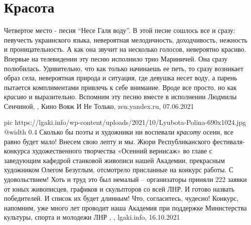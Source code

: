  
 
 
 
 
\chapter{Красота}
\label{sec:slova.krasota}

Четвертое место - песня \enquote{Несе Галя воду}. В этой песне сошлось все и
сразу: певучесть украинского языка, невероятная мелодичность, доходчивость,
нежность и проницательность. А как она звучит на несколько голосов, невероятно
красиво. Впервые на телевидении эту песню исполнило трио Мариничей. Она сразу
полюбилась. Удивительно, что как только начинаешь ее петь, то сразу возникает
образ села, невероятная природа и ситуация, где девушка несет воду, а парень
пытается комплиментами привлечь к себе внимание. Вроде все просто, но как
\emph{красиво} и выразительно. Вспомним эту песню вместе в исполнении Людмилы
Сенчиной,
, 
Кино Вояж И Не Только, zen.yandex.ru, 07.06.2021

\ifcmt
  pic https://lgaki.info/wp-content/uploads/2021/10/Lyubota-Polina-690x1024.jpg
  @width 0.4
\fi
Сколько бы поэты и художники ни воспевали \emph{красоту} осени, все равно будет
мало!  Внесем свою лепту и мы. Жюри Республиканского фестиваля-конкурса
художественного творчества «Осенний вернисаж» во главе с заведующим кафедрой
станковой живописи нашей Академии, прекрасным художником Олегом Безуглым,
отсмотрело присланные на конкурс работы. С удовольствием! Хоть и труд это был
немалый – организаторы приняли 222 заявки от юных живописцев, графиков и
скульпторов со всей ЛНР. И готово назвать победителей. И список их будет
длинным! Что, согласитесь, чудесно!  Конкурс, напомним, уже много лет проводит
наша Академия при поддержке Министерства культуры, спорта и молодежи ЛНР
, , lgaki.info, 16.10.2021

